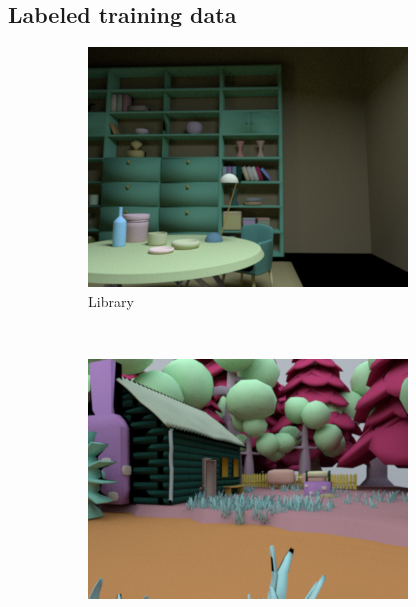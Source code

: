 \documentclass{jov}
\begin{document}
\subsection{Labeled training data} \label{method:VirtualWorld}
\begin{figure}[t]
\centering
\begin{subfigure}[b]{0.22 \textwidth}
        \includegraphics[width=\textwidth]{../Figures/Figure3/Figure3_a.png}
        \caption{Library }
        \label{fig:baseSceneLibrary}
    \end{subfigure}
    ~
    \begin{subfigure}[b]{0.22 \textwidth}
        \includegraphics[width=\textwidth]{../Figures/Figure3/Figure3_b.png}

\end{subfigure}
\end{figure}
\end{document}
